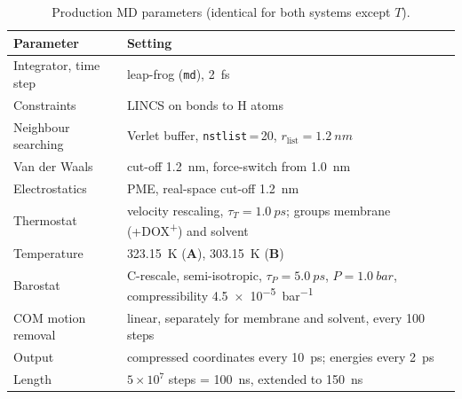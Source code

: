 \documentclass[11pt,a4paper]{article}
\newcommand{\dox}{DOX\textsuperscript{+}}
\newcommand{\sysA}{\textcolor{sysA}{\textbf{A}}}
\newcommand{\sysB}{\textcolor{sysB}{\textbf{B}}}
\begin{document}
\begin{table}[!htbp]
\centering
\caption[Production MD parameters]{Production MD parameters (identical for both systems except $T$).}
\label{tab:mdp}
\begin{tabularx}{0.92\linewidth}{@{}lX@{}}
\toprule
Parameter & Setting \\
\midrule
Integrator, time step & leap-frog (\texttt{md}), \SI{2}{fs} \\
Constraints & LINCS on bonds to H atoms \\
Neighbour searching & Verlet buffer, \texttt{nstlist}\,=\,20, $r_\mathrm{list}=\SI{1.2}{nm}$ \\
Van der Waals & cut-off \SI{1.2}{nm}, force-switch from \SI{1.0}{nm} \\
Electrostatics & PME, real-space cut-off \SI{1.2}{nm} \\
Thermostat & velocity rescaling, $\tau_T=\SI{1.0}{ps}$; groups membrane (+\dox) and solvent \\
Temperature & \SI{323.15}{K} (\sysA), \SI{303.15}{K} (\sysB) \\
Barostat & C-rescale, semi-isotropic, $\tau_P=\SI{5.0}{ps}$, $P=\SI{1.0}{bar}$,
           compressibility \SI{4.5e-5}{bar^{-1}} \\
COM motion removal & linear, separately for membrane and solvent, every 100 steps \\
Output & compressed coordinates every \SI{10}{ps}; energies every \SI{2}{ps} \\
Length & $5\times10^7$ steps = \SI{100}{ns}, extended to \SI{150}{ns} \\
\bottomrule
\end{tabularx}
\end{table}
\end{document}
